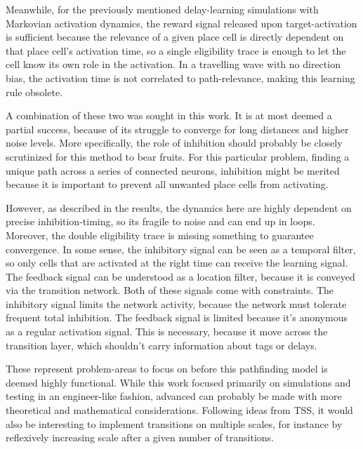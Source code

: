 \documentclass{article}
\begin{document}
Meanwhile, for the previously mentioned delay-learning simulations with Markovian activation dynamics, the reward signal released upon target-activation is sufficient because the relevance of a given place cell is directly dependent on that place cell's activation time, so a single eligibility trace is enough to let the cell know its own role in the activation. In a travelling wave with no direction bias, the activation time is not correlated to path-relevance, making this learning rule obsolete.

A combination of these two was sought in this work. It is at most deemed a partial success, because of its struggle to converge for long distances and higher noise levels. More specifically, the role of inhibition should probably be closely scrutinized for this method to bear fruits. For this particular problem, finding a unique path across a series of connected neurons, inhibition might be merited because it is important to prevent all unwanted place cells from activating.

However, as described in the results, the dynamics here are highly dependent on precise inhibition-timing, so its fragile to noise and can end up in loops. Moreover, the double eligibility trace is missing something to guarantee convergence. In some sense, the inhibitory signal can be seen as a temporal filter, so only cells that are activated at the right time can receive the learning signal. The feedback signal can be understood as a location filter, because it is conveyed via the transition network. Both of these signals come with constraints. The inhibitory signal limits the network activity, because the network must tolerate frequent total inhibition. The feedback signal is limited because it's anonymous as a regular activation signal. This is necessary, because it move across the transition layer, which shouldn't carry information about tags or delays.

These represent problem-areas to focus on before this pathfinding model is deemed highly functional. While this work focused primarily on simulations and testing in an engineer-like fashion, advanced can probably be made with more theoretical and mathematical considerations. Following ideas from TSS, it would also be interesting to implement transitions on multiple scales, for instance by reflexively increasing scale after a given number of transitions.
\end{document}
